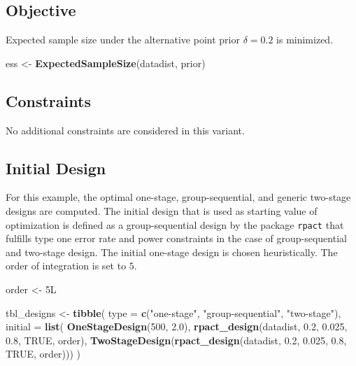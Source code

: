 \documentclass[
]{book}
\newenvironment{Shaded}{\begin{snugshade}}{\end{snugshade}}
\newcommand{\DataTypeTok}[1]{\textcolor[rgb]{0.13,0.29,0.53}{#1}}
\newcommand{\DecValTok}[1]{\textcolor[rgb]{0.00,0.00,0.81}{#1}}
\newcommand{\FloatTok}[1]{\textcolor[rgb]{0.00,0.00,0.81}{#1}}
\newcommand{\KeywordTok}[1]{\textcolor[rgb]{0.13,0.29,0.53}{\textbf{#1}}}
\newcommand{\NormalTok}[1]{#1}
\newcommand{\OtherTok}[1]{\textcolor[rgb]{0.56,0.35,0.01}{#1}}
\newcommand{\StringTok}[1]{\textcolor[rgb]{0.31,0.60,0.02}{#1}}
\begin{document}
\hypertarget{objective-7}{%
\subsection{Objective}\label{objective-7}}

Expected sample size under the alternative point prior \(\delta = 0.2\)
is minimized.

\begin{Shaded}
\begin{Highlighting}[]
\NormalTok{ess <-}\StringTok{ }\KeywordTok{ExpectedSampleSize}\NormalTok{(datadist, prior)}
\end{Highlighting}
\end{Shaded}

\hypertarget{constraints-7}{%
\subsection{Constraints}\label{constraints-7}}

No additional constraints are considered in this variant.

\hypertarget{initial-design-5}{%
\subsection{Initial Design}\label{initial-design-5}}

For this example, the optimal one-stage, group-sequential, and generic
two-stage designs are computed.
The initial design that is used as starting value of optimization is defined
as a group-sequential design by the package \texttt{rpact} that fulfills
type one error rate and power constraints in the case of group-sequential and
two-stage design.
The initial one-stage design is chosen heuristically.
The order of integration is set to \(5\).

\begin{Shaded}
\begin{Highlighting}[]
\NormalTok{order <-}\StringTok{ }\NormalTok{5L }

\NormalTok{tbl_designs <-}\StringTok{ }\KeywordTok{tibble}\NormalTok{(}
    \DataTypeTok{type    =} \KeywordTok{c}\NormalTok{(}\StringTok{"one-stage"}\NormalTok{, }\StringTok{"group-sequential"}\NormalTok{, }\StringTok{"two-stage"}\NormalTok{),}
    \DataTypeTok{initial =} \KeywordTok{list}\NormalTok{(}
        \KeywordTok{OneStageDesign}\NormalTok{(}\DecValTok{500}\NormalTok{, }\FloatTok{2.0}\NormalTok{),}
        \KeywordTok{rpact_design}\NormalTok{(datadist, }\FloatTok{0.2}\NormalTok{, }\FloatTok{0.025}\NormalTok{, }\FloatTok{0.8}\NormalTok{, }\OtherTok{TRUE}\NormalTok{, order),}
        \KeywordTok{TwoStageDesign}\NormalTok{(}\KeywordTok{rpact_design}\NormalTok{(datadist, }\FloatTok{0.2}\NormalTok{, }\FloatTok{0.025}\NormalTok{, }\FloatTok{0.8}\NormalTok{, }\OtherTok{TRUE}\NormalTok{, order))) )}
\end{Highlighting}
\end{Shaded}
\end{document}
